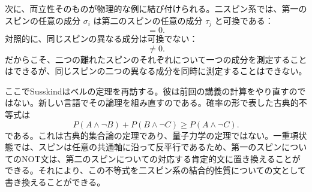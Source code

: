 次に、両立性そのものが物理的な例に結び付けられる。二スピン系では、第一のスピンの任意の成分 \(\sigma_i\) は第二のスピンの任意の成分 \(\tau_j\) と可換である：
\begin{equation}
[\sigma_i,\tau_j]=0.
\end{equation}
対照的に、同じスピンの異なる成分は可換でない：
\begin{equation}
[\sigma_1,\sigma_3]\neq 0.
\end{equation}
だからこそ、二つの離れたスピンのそれぞれについて一つの成分を測定することはできるが、同じスピンの二つの異なる成分を同時に測定することはできない。

\begin{classroomqa}
\end{classroomqa}

\begin{classroomqa}
\end{classroomqa}

\begin{classroomqa}
\end{classroomqa}

ここでSusskindはベルの定理を再訪する。彼は前回の講義の計算をやり直すのではない。新しい言語でその論理を組み直すのである。確率の形で表した古典的不等式は
\begin{equation}
P(A\wedge \neg B)+P(B\wedge \neg C)\ge P(A\wedge \neg C).
\end{equation}
である。これは古典的集合論の定理であり、量子力学の定理ではない。一重項状態では、スピンは任意の共通軸に沿って反平行であるため、第一のスピンについてのNOT文は、第二のスピンについての対応する肯定的文に置き換えることができる。それにより、この不等式を二スピン系の結合的性質についての文として書き換えることができる。

